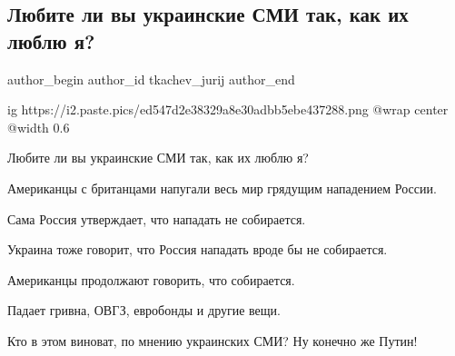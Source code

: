  
 
 
 
 
 
\subsection{Любите ли вы украинские СМИ так, как их люблю я?}
\label{sec:26_01_2022.tg.tkachev_jurij.1.ukrsmi}
 
\ifcmt
 author_begin
   author_id tkachev_jurij
 author_end
\fi

\ifcmt
  ig https://i2.paste.pics/ed547d2e38329a8e30adbb5ebe437288.png
	@wrap center
	@width 0.6
\fi

Любите ли вы украинские СМИ так, как их люблю я?

Американцы с британцами напугали весь мир грядущим нападением России.

Сама Россия утверждает, что нападать не собирается.

Украина тоже говорит, что Россия нападать вроде бы не собирается.

Американцы продолжают говорить, что собирается.

Падает гривна, ОВГЗ, евробонды и другие вещи. 

Кто в этом виноват, по мнению украинских СМИ? Ну конечно же Путин!

